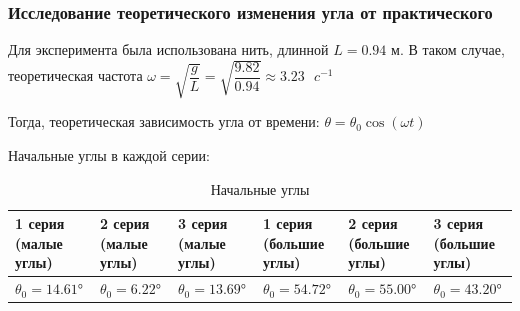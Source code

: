 \documentclass{report}
\begin{document}
\begin{enumerate}
\subsubsection{Исследование теоретического изменения угла от практического}

Для эксперимента была использована нить, длинной $L = 0.94 \text{ м}$. В таком случае, теоретическая частота $\omega = \sqrt{\dfrac{g}{L}} =  \sqrt{\dfrac{9.82}{0.94}} \approx 3.23 \text{ } c^{-1}$

Тогда, теоретическая зависимость угла от времени: $\theta = \theta_0\cos{(\omega t)}$

Начальные углы в каждой серии: 


\begin{table}[H]
    \centering
    \begin{tabular}{|p{2cm}|p{2cm}|p{2cm}|p{2.5cm}|p{2.5cm}|p{2.5cm}|}
        \hline 
        1 серия (малые углы) & 2 серия (малые углы) & 3 серия (малые углы) & 
        1 серия (большие углы) & 2 серия (большие углы) & 3 серия (большие углы) \\ 
        \hline 
        $\theta_0 = \ang{14.61}$ & $\theta_0 = \ang{6.22}$ & $\theta_0 = \ang{13.69}$ & 
        $\theta_0 = \ang{54.72}$ & $\theta_0 = \ang{55.00}$ & $\theta_0 = \ang{43.20}$ \\ 
        \hline
    \end{tabular}
    \caption{Начальные углы}
    \label{tab:value}
\end{table}


\end{enumerate}
\end{document}
